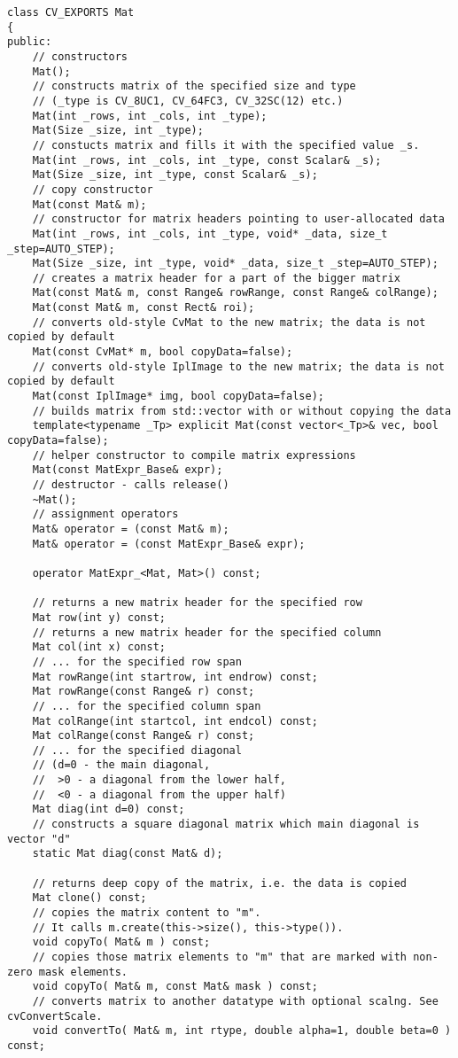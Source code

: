 \begin{lstlisting}
class CV_EXPORTS Mat
{
public:
    // constructors
    Mat();
    // constructs matrix of the specified size and type
    // (_type is CV_8UC1, CV_64FC3, CV_32SC(12) etc.)
    Mat(int _rows, int _cols, int _type);
    Mat(Size _size, int _type);
    // constucts matrix and fills it with the specified value _s.
    Mat(int _rows, int _cols, int _type, const Scalar& _s);
    Mat(Size _size, int _type, const Scalar& _s);
    // copy constructor
    Mat(const Mat& m);
    // constructor for matrix headers pointing to user-allocated data
    Mat(int _rows, int _cols, int _type, void* _data, size_t _step=AUTO_STEP);
    Mat(Size _size, int _type, void* _data, size_t _step=AUTO_STEP);
    // creates a matrix header for a part of the bigger matrix
    Mat(const Mat& m, const Range& rowRange, const Range& colRange);
    Mat(const Mat& m, const Rect& roi);
    // converts old-style CvMat to the new matrix; the data is not copied by default
    Mat(const CvMat* m, bool copyData=false);
    // converts old-style IplImage to the new matrix; the data is not copied by default
    Mat(const IplImage* img, bool copyData=false);
    // builds matrix from std::vector with or without copying the data
    template<typename _Tp> explicit Mat(const vector<_Tp>& vec, bool copyData=false);
    // helper constructor to compile matrix expressions
    Mat(const MatExpr_Base& expr);
    // destructor - calls release()
    ~Mat();
    // assignment operators
    Mat& operator = (const Mat& m);
    Mat& operator = (const MatExpr_Base& expr);

    operator MatExpr_<Mat, Mat>() const;

    // returns a new matrix header for the specified row
    Mat row(int y) const;
    // returns a new matrix header for the specified column
    Mat col(int x) const;
    // ... for the specified row span
    Mat rowRange(int startrow, int endrow) const;
    Mat rowRange(const Range& r) const;
    // ... for the specified column span
    Mat colRange(int startcol, int endcol) const;
    Mat colRange(const Range& r) const;
    // ... for the specified diagonal
    // (d=0 - the main diagonal,
    //  >0 - a diagonal from the lower half,
    //  <0 - a diagonal from the upper half)
    Mat diag(int d=0) const;
    // constructs a square diagonal matrix which main diagonal is vector "d"
    static Mat diag(const Mat& d);

    // returns deep copy of the matrix, i.e. the data is copied
    Mat clone() const;
    // copies the matrix content to "m".
    // It calls m.create(this->size(), this->type()).
    void copyTo( Mat& m ) const;
    // copies those matrix elements to "m" that are marked with non-zero mask elements.
    void copyTo( Mat& m, const Mat& mask ) const;
    // converts matrix to another datatype with optional scalng. See cvConvertScale.
    void convertTo( Mat& m, int rtype, double alpha=1, double beta=0 ) const;


\end{lstlisting}
